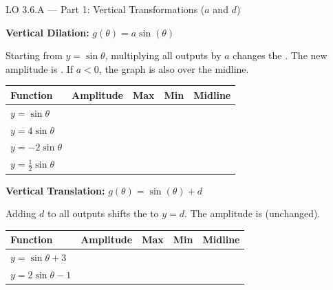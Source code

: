 \documentclass[10pt]{article}
\begin{document}
\begin{notesbox}{LO 3.6.A --- Part 1: Vertical Transformations ($a$ and $d$)}

\textbf{Vertical Dilation:} $g(\theta) = a\sin(\theta)$

Starting from $y = \sin\theta$, multiplying all outputs by $a$ changes the
\underline{\hspace{2cm}}. The new amplitude is \underline{\hspace{1.5cm}}.
If $a < 0$, the graph is also \underline{\hspace{3cm}} over the midline.

\vspace{6pt}
\renewcommand{\arraystretch}{1.5}
\begin{tabular}{|l|c|c|c|c|}
\hline
\textbf{Function} & \textbf{Amplitude} & \textbf{Max} & \textbf{Min} & \textbf{Midline} \\
\hline
$y = \sin\theta$ & & & & \\
\hline
$y = 4\sin\theta$ & & & & \\
\hline
$y = -2\sin\theta$ & & & & \\
\hline
$y = \tfrac{1}{2}\sin\theta$ & & & & \\
\hline
\end{tabular}

\vspace{8pt}
\textbf{Vertical Translation:} $g(\theta) = \sin(\theta) + d$

Adding $d$ to all outputs shifts the \underline{\hspace{2cm}} to $y = d$.
The amplitude is \underline{\hspace{3cm}} (unchanged).

\vspace{6pt}
\begin{tabular}{|l|c|c|c|c|}
\hline
\textbf{Function} & \textbf{Amplitude} & \textbf{Max} & \textbf{Min} & \textbf{Midline} \\
\hline
$y = \sin\theta + 3$ & & & & \\
\hline
$y = 2\sin\theta - 1$ & & & & \\
\hline
\end{tabular}

\end{notesbox}

\vspace{0.08in}
\end{document}
